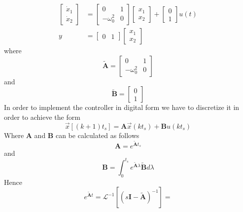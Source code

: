 \documentclass[12pt,a4paper,oneside]{book}
\begin{document}
\begin{onehalfspace}
\begin{example}
\begin{equation}
		\begin{aligned}
			\left[ \begin{matrix}
				\dot{x}_1 \\[6pt]
				\dot{x}_2
			\end{matrix}\right] &= 
			\left[ \begin{matrix}
				0 & 1 \\[6pt]
				-\omega_0^2 & 0
			\end{matrix}\right] 
			\left[ \begin{matrix}
				{x}_1 \\[6pt]
				{x}_2
			\end{matrix}\right]+
			\left[ \begin{matrix}
				0 \\[6pt]
				1
			\end{matrix}\right] u(t) \\[6pt]
			y &= 
			\left[ \begin{matrix}
				0 & 1
			\end{matrix}\right] 
			\left[ \begin{matrix}
				{x}_1 \\[6pt]
				{x}_2
			\end{matrix}\right]
		\end{aligned}
	\end{equation}
	where
	\begin{equation}
		\tilde{\mathbf{A}} = 
		\left[ \begin{matrix}
			0 & 1 \\[6pt]
			-\omega_0^2 & 0
		\end{matrix}\right]
	\end{equation}
	and 
	\begin{equation}
		\tilde{\mathbf{B}} = 
		\left[ \begin{matrix}
			0 \\[6pt]
			1
		\end{matrix}\right]
	\end{equation}
	In order to implement the controller in digital form we have to discretize it in order to achieve the form
	\begin{equation}
		\vec{x}\left[(k+1)t_s\right] = \mathbf{A}\vec{x}(kt_s)+\mathbf{B}u(kt_s) 
	\end{equation}
	Where $\mathbf{A}$ and $\mathbf{B}$ can be calculated as follows
	\begin{equation*}
		{\mathbf{A}} = e^{\tilde{\mathbf{A}}t_s}
	\end{equation*}
	and 
	\begin{equation}
		{\mathbf{B}} =  \int_{0}^{t_s}e^{\tilde{\mathbf{A}}\lambda}\tilde{\mathbf{B}}d\lambda
	\end{equation}
	Hence
	\begin{equation}
		e^{\tilde{\mathbf{A}}t} = \mathcal{L}^{-1}\left[ \left(s\mathbf{I}-\tilde{\mathbf{A}} \right)^{-1} \right] =
	\end{equation}
	

\end{example}
\end{onehalfspace}
\end{document}

